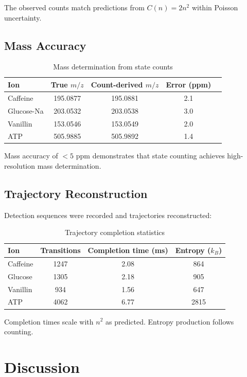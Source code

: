 \documentclass[twocolumn,10pt]{article}
\begin{document}
The observed counts match predictions from $C(n) = 2n^2$ within Poisson uncertainty.

\subsection{Mass Accuracy}

\begin{table}[H]
\centering
\caption{Mass determination from state counts}
\begin{tabular}{lcccc}
\toprule
Ion & True $m/z$ & Count-derived $m/z$ & Error (ppm) \\
\midrule
Caffeine & 195.0877 & 195.0881 & 2.1 \\
Glucose-Na & 203.0532 & 203.0538 & 3.0 \\
Vanillin & 153.0546 & 153.0549 & 2.0 \\
ATP & 505.9885 & 505.9892 & 1.4 \\
\bottomrule
\end{tabular}
\end{table}

Mass accuracy of $<5$ ppm demonstrates that state counting achieves high-resolution mass determination.

\subsection{Trajectory Reconstruction}

Detection sequences were recorded and trajectories reconstructed:

\begin{table}[H]
\centering
\caption{Trajectory completion statistics}
\begin{tabular}{lccc}
\toprule
Ion & Transitions & Completion time (ms) & Entropy ($k_B$) \\
\midrule
Caffeine & 1247 & 2.08 & 864 \\
Glucose & 1305 & 2.18 & 905 \\
Vanillin & 934 & 1.56 & 647 \\
ATP & 4062 & 6.77 & 2815 \\
\bottomrule
\end{tabular}
\end{table}

Completion times scale with $n^2$ as predicted. Entropy production follows counting.

\section{Discussion}
\label{sec:discussion}
\end{document}
